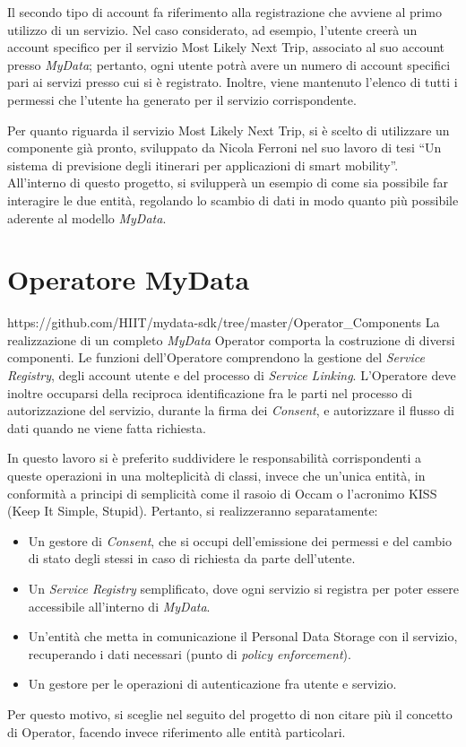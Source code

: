 Il secondo tipo di account fa riferimento alla registrazione che avviene al primo utilizzo di un servizio. Nel caso considerato, ad esempio, l’utente creer\`a un account specifico per il servizio Most Likely Next Trip, associato al suo account presso \textit{MyData}; pertanto, ogni utente potr\`a avere un numero di account specifici pari ai servizi presso cui si \`e registrato. Inoltre, viene mantenuto l’elenco di tutti i permessi che l’utente ha generato per il servizio corrispondente.

Per quanto riguarda il servizio Most Likely Next Trip, si \`e scelto di utilizzare un componente gi\`a pronto, sviluppato da Nicola Ferroni nel suo lavoro di tesi “Un sistema di previsione degli itinerari per applicazioni di smart mobility”.  All’interno di questo progetto, si svilupper\`a un esempio di come sia possibile far interagire le due entit\`a, regolando lo scambio di dati in modo quanto pi\`u possibile aderente al modello \textit{MyData}.

\section{Operatore MyData}
https://github.com/HIIT/mydata-sdk/tree/master/Operator\_Components
La realizzazione di un completo \textit{MyData} Operator comporta la costruzione di diversi componenti. Le funzioni dell’Operatore comprendono la gestione del \textit{Service Registry}, degli account utente e del processo di \textit{Service Linking}. L’Operatore deve inoltre occuparsi della reciproca identificazione fra le parti nel processo di autorizzazione del servizio, durante la firma dei \textit{Consent}, e autorizzare il flusso di dati quando ne viene fatta richiesta.

In questo lavoro si \`e preferito suddividere le responsabilit\`a corrispondenti a queste operazioni in una molteplicit\`a di classi, invece che un’unica entit\`a, in conformit\`a a principi di semplicit\`a come il rasoio di Occam o l’acronimo KISS (Keep It Simple, Stupid). Pertanto, si realizzeranno separatamente:
\begin{itemize}
	\item Un gestore di \textit{Consent}, che si occupi dell’emissione dei permessi e del cambio di stato degli stessi in caso di richiesta da parte dell’utente.
	\item Un \textit{Service Registry} semplificato, dove ogni servizio si registra per poter essere accessibile all’interno di \textit{MyData}.
	\item Un’entit\`a che metta in comunicazione il Personal Data Storage con il servizio, recuperando i dati necessari (punto di \textit{policy enforcement}).
	\item Un gestore per le operazioni di autenticazione fra utente e servizio.
\end{itemize}
Per questo motivo, si sceglie nel seguito del progetto di non citare pi\`u il concetto di Operator, facendo invece riferimento alle entit\`a particolari.

